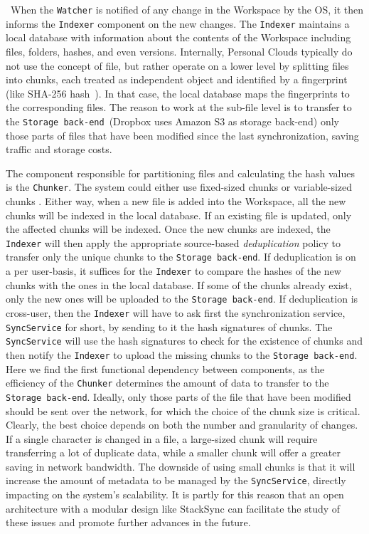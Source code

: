 ~When the \texttt{Watcher} is notified of any change in the Workspace by the OS, it then informs 
the \texttt{Indexer} component on the new changes.  The \texttt{Indexer} maintains a local database 
with information about the contents of the Workspace including files, folders, hashes, and even versions. 
Internally, Personal Clouds typically do not use the concept of file, but rather operate on a lower level by splitting
files into chunks, each treated as independent object and identified by a fingerprint (like SHA-256 hash~\cite{drago2012inside}). 
In that case, the local database maps the fingerprints to the corresponding files. The reason to work
at the sub-file level is to transfer to the \texttt{Storage back-end}~(Dropbox uses Amazon S3 as storage back-end) only 
those parts of files that have been modified since the last synchronization, saving traffic and storage costs.

The component responsible for partitioning files and calculating the hash values is the \texttt{Chunker}.
The system could either use fixed-sized chunks or variable-sized chunks \cite{Muthitacharoen01}. Either way,
when a new file is added into the Workspace, all the new chunks will be indexed in the local database. If an existing
file is updated, only the affected chunks will be indexed. 
Once the new chunks are indexed, the \texttt{Indexer} will then apply the appropriate source-based \textit{deduplication} policy
to transfer only the unique chunks to the \texttt{Storage back-end}. If deduplication is on a per user-basis, it suffices
for the \texttt{Indexer} to compare the hashes of the new chunks with the ones in the local database. If some of the chunks already exist,
only the new ones will be uploaded to the \texttt{Storage back-end}. If deduplication is cross-user, then the \texttt{Indexer}
will have to ask first the synchronization service, \texttt{SyncService} for short, by sending to it the hash signatures of chunks.
The \texttt{SyncService} will use the hash signatures to check for the existence of chunks and then notify the \texttt{Indexer} to
upload the missing chunks to the \texttt{Storage back-end}. Here we find the first functional dependency between components, as the 
efficiency of the \texttt{Chunker} determines the amount of data to transfer to the \texttt{Storage back-end}. Ideally, only those
parts of the file that have been modified should be sent over the network, for which the choice of the chunk size is critical. 
Clearly, the best choice depends on both the number and granularity of changes. If a single character is changed in a file, 
a large-sized chunk will require transferring a lot of duplicate data, while a smaller chunk will offer a greater saving
in network bandwidth. The downside of using small chunks is that it will increase the amount of metadata to
be managed by the \texttt{SyncService}, directly impacting on the system's scalability. It is partly for this reason that an
open architecture with a modular design like StackSync can facilitate the study of these issues 
and promote further advances in the future.


